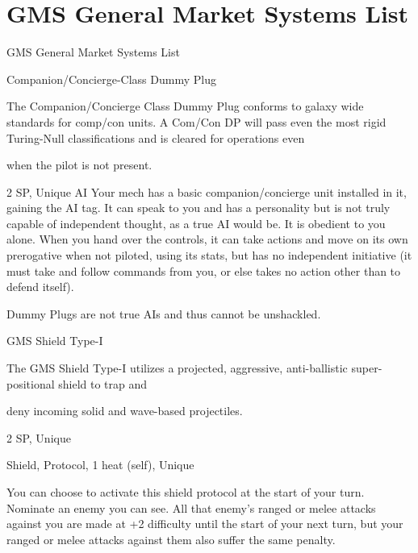 \section{GMS General Market Systems List}
                                GMS General Market Systems List  

Companion/Concierge-Class Dummy Plug  

The Companion/Concierge Class Dummy Plug conforms to galaxy wide standards for comp/con units. A  
Com/Con DP will pass even the most rigid Turing-Null classifications and is cleared for operations even  

when the pilot is not present.   

2 SP, Unique  
AI  
Your mech has a basic companion/concierge unit installed in it, gaining the AI tag. It can speak  
to you and has a personality but is not truly capable of independent thought, as a true AI would  
be. It is obedient to you alone. When you hand over the controls, it can take actions and move  
on its own prerogative when not piloted, using its stats, but has no independent initiative (it must  
take and follow commands from you, or else takes no action other than to defend itself).
 

Dummy Plugs are not true AIs and thus cannot be unshackled.
 

GMS Shield Type-I  

The GMS Shield Type-I utilizes a projected, aggressive, anti-ballistic super-positional shield to trap and  

deny incoming solid and wave-based projectiles.   
   

2 SP, Unique
 
Shield, Protocol, 1 heat (self), Unique
 

                                                                                                                       


You can choose to activate this shield protocol at the start of your turn. Nominate an enemy you  
can see. All that enemy’s ranged or melee attacks against you are made at +2 difficulty until the  
start of your next turn, but your ranged or melee attacks against them also suffer the same  
penalty.